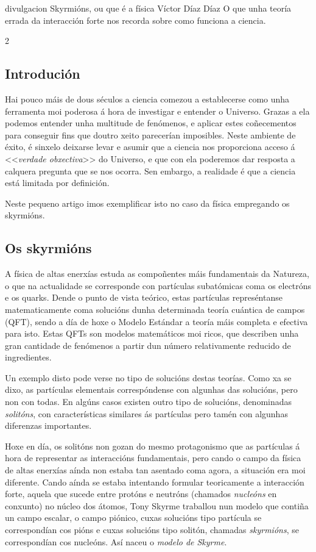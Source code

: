 \Titular
{divulgacion}
{Skyrmións, ou que é a física}
{Víctor Díaz Díaz}
{O que unha teoría errada da interacción forte nos recorda sobre como funciona a ciencia.}

\begin{multicols}{2}

\subsection*{Introdución}

Hai pouco máis de dous séculos a ciencia comezou a establecerse como unha
ferramenta moi poderosa á hora de investigar e entender o Universo. Grazas a
ela podemos entender unha multitude de fenómenos, e aplicar estes coñecementos
para conseguir fins que doutro xeito parecerían imposibles. Neste ambiente de
éxito, é sinxelo deixarse levar e asumir que a ciencia nos proporciona acceso á
<<\textit{verdade obxectiva}>> do Universo, e que con ela poderemos dar
resposta a calquera pregunta que se nos ocorra. Sen embargo, a realidade é que
a ciencia está limitada por definición.

Neste pequeno artigo imos exemplificar isto no caso da física empregando os
skyrmións.

\subsection*{Os skyrmións}

A física de altas enerxías estuda as compoñentes máis fundamentais da Natureza,
o que na actualidade se corresponde con partículas subatómicas coma os
electróns e os quarks. Dende o punto de vista teórico, estas partículas
represéntanse matematicamente coma solucións dunha determinada teoría cuántica
de campos (QFT), sendo a día de hoxe o Modelo Estándar a teoría máis completa e
efectiva para isto. Estas QFTs son modelos matemáticos moi ricos, que describen
unha gran cantidade de fenómenos a partir dun número relativamente reducido de
ingredientes.

Un exemplo disto pode verse no tipo de solucións destas teorías. Como xa se
dixo, as partículas elementais correspóndense con algunhas das solucións, pero
non con todas. En algúns casos existen outro tipo de solucións, denominadas
\textit{solitóns}, con características similares ás partículas pero tamén con
algunhas diferenzas importantes.

Hoxe en día, os solitóns non gozan do mesmo protagonismo que as partículas á
hora de representar as interaccións fundamentais, pero cando o campo da física
de altas enerxías aínda non estaba tan asentado coma agora, a situación era moi
diferente. Cando aínda se estaba intentando formular teoricamente a interacción
forte, aquela que sucede entre protóns e neutróns (chamados \textit{nucleóns}
en conxunto) no núcleo dos átomos, Tony Skyrme traballou nun modelo que contiña
un campo escalar, o campo piónico, cuxas solucións tipo partícula se
correspondían cos pións e cuxas solucións tipo solitón, chamadas
\textit{skyrmións}, se correspondían cos nucleóns. Así naceu o \textit{modelo
de Skyrme}.


\end{multicols}
